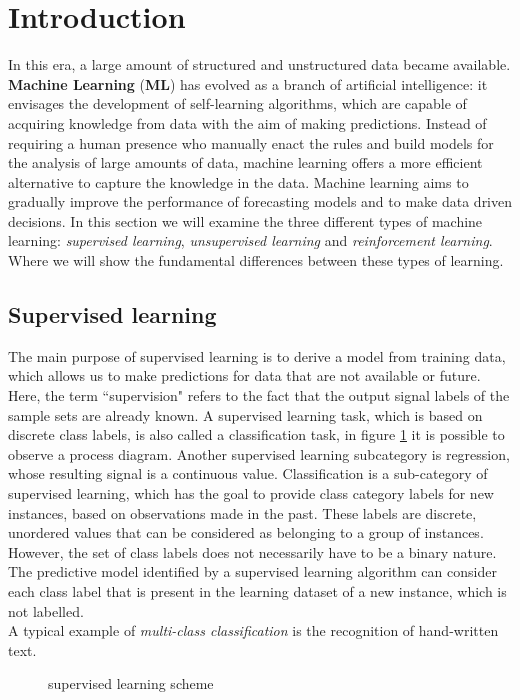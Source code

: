 \section{Introduction}
\label{sec:intro}
In this era, a large amount of structured and unstructured data became available.
\textbf{Machine Learning} (\textbf{ML}) has evolved as a branch of artificial
intelligence: it envisages the development of self-learning algorithms, which are
capable of acquiring knowledge from data with the aim of making predictions.
Instead of requiring a human presence who manually enact the rules and
build models for the analysis of large amounts of data, machine learning offers
a more efficient alternative to capture the knowledge in the data. Machine learning
aims to gradually improve the performance of forecasting models and
to make data driven decisions.
In this section we will examine the three different types of machine learning:
\emph{supervised learning}, \emph{unsupervised learning} and
\emph{reinforcement learning}.
Where we will show the fundamental differences between these types of
learning.\cite{raschka2016machine}
%
\subsection{Supervised learning}
\label{subsec:supervised-learnig}
The main purpose of supervised learning is to derive a model from 
training data, which allows us to make predictions for data that are not
available or future.
Here, the term ``supervision" refers to the fact that the output signal labels 
of the sample sets are already known.
A supervised learning task, which is based on discrete class labels, is also 
called a classification task, in figure \ref{fig:supervised-learning-scheme} it 
is possible to observe a process diagram.
Another supervised learning subcategory is regression, whose resulting
signal is a continuous value.
Classification is a sub-category of supervised learning, which has the goal to
provide class category labels for new instances, based on observations made in
the past.
These labels are discrete, unordered values ​​that can be considered as
belonging to a group of instances.
However, the set of class labels does not necessarily have to be a binary
nature.
The predictive model identified by a supervised learning algorithm can consider
each class label that is present in the learning dataset of a new instance, which
is not labelled.\\
A typical example of \emph{multi-class classification} is the recognition of
hand-written text.\cite{raschka2016machine}
%
\begin{figure}[!h]
\centering
\resizebox{\linewidth}{!}{}
\caption{supervised learning scheme} 
\label{fig:supervised-learning-scheme}
\end{figure}
%
